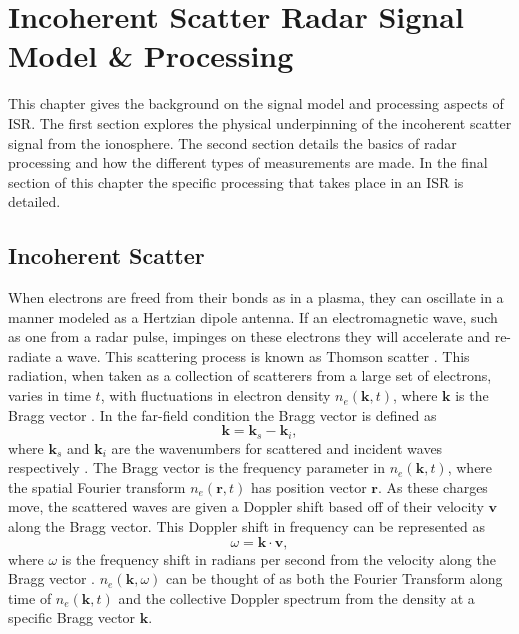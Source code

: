 \chapter{Incoherent Scatter Radar Signal Model \& Processing}
\label{chapter:isrproc}
\thispagestyle{myheadings}

\graphicspath{{2_ISRProc/Figures/}}


This chapter gives the background on the signal model and processing aspects of ISR. The first section explores the physical  underpinning of the incoherent scatter signal from the ionosphere. The second section details the basics of radar processing and how the different types of measurements are made. In the final section of this chapter the specific processing that takes place in an ISR is detailed.

\section{Incoherent Scatter}
\label{sec:incohscat}
When electrons are freed from their bonds as in a plasma, they can oscillate in a manner modeled as a Hertzian dipole antenna. If an electromagnetic wave, such as one from a radar pulse, impinges on these electrons they will accelerate and re-radiate a wave. This scattering process is known as Thomson scatter \citep{Hutchinson_2002}. This radiation, when taken as a collection of scatterers from a large set of electrons, varies in time $t$, with fluctuations in electron density $n_e(\mathbf{k},t)$, where $\mathbf{k}$ is the Bragg vector \citep{kudeki:milla:1}. In the far-field condition the Bragg vector is defined as
\begin{equation}
\label{eqn:bragg}
\mathbf{k}=\mathbf{k}_s-\mathbf{k}_i,
\end{equation}
where $\mathbf{k}_s$ and $\mathbf{k}_i$ are the wavenumbers for scattered and incident waves respectively \citep{sheffield2010}. The Bragg vector is the frequency parameter in $n_e(\mathbf{k},t)$, where the spatial Fourier transform $n_e(\mathbf{r},t)$ has position vector $\mathbf{r}$. As these charges move, the scattered waves are given a Doppler shift based off of their velocity $\mathbf{v}$ along the Bragg vector. This Doppler shift in frequency can be represented as
\begin{equation}
\label{eqn:dop1}
\omega=\mathbf{k} \cdot \mathbf{v},
\end{equation}
where $\omega$ is the frequency shift in radians per second from the velocity along the Bragg vector \citep{sheffield2010}. $n_e(\mathbf{k}, \omega)$ can be thought of as both the Fourier Transform along time of $n_e(\mathbf{k},t)$ and the collective Doppler spectrum from the density at a specific Bragg vector $\mathbf{k}$.

